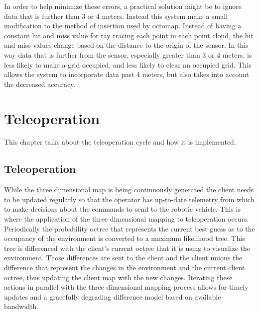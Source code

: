 \documentclass[12pt]{report}
\begin{document}
In order to help minimize these errors, a practical solution might be to ignore data that is further than 3 or 4 meters.  Instead this system make a small modification to the method of insertion used by octomap.  Instead of having a constant hit and miss value for ray tracing each point in each point cloud, the hit and miss values change based on the distance to the origin of the sensor.  In this way data that is further from the sensor, especially greater than 3 or 4 meters, is less likely to make a grid occupied, and less likely to clear an occupied grid.  This allows the system to incorporate data past 4 meters, but also takes into account the decreased accuracy.


\chapter{Teleoperation}\label{chap:teleoperation}
This chapter talks about the teleoperation cycle and how it is implemented.

\section{Teleoperation}
While the three dimensional map is being continuously generated the client needs to be updated regularly so that the operator has up-to-date telemetry from which to make decisions about the commands to send to the robotic vehicle. This is where the application of the three dimensional mapping to teleoperation occurs. Periodically the probability octree that represents the current best guess as to the occupancy of the environment is converted to a maximum likelihood tree. This tree is differenced with the client's current octree that it is using to visualize the environment. Those differences are sent to the client and the client unions the difference that represent the changes in the environment and the current client octree, thus updating the client map with the new changes. Iterating these actions in parallel with the three dimensional mapping process allows for timely updates and a gracefully degrading difference model based on available bandwidth.
\end{document}
